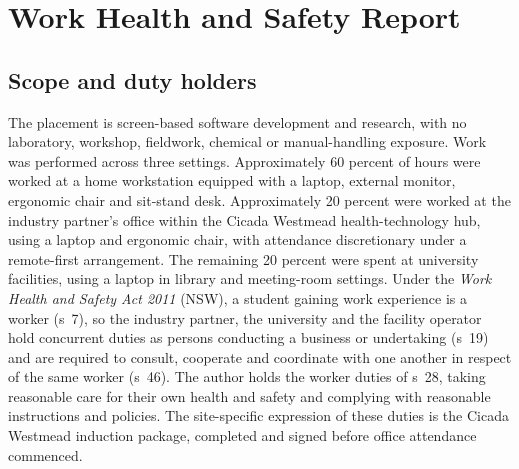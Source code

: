
\section{Work Health and Safety Report}
\label{app:whs}

\subsection{Scope and duty holders}
The placement is screen-based software development and research, with no
laboratory, workshop, fieldwork, chemical or manual-handling exposure. Work
was performed across three settings. Approximately 60 percent of hours were
worked at a home workstation equipped with a laptop, external monitor,
ergonomic chair and sit-stand desk. Approximately 20 percent were worked at
the industry partner's office within the Cicada Westmead health-technology
hub, using a laptop and ergonomic chair, with attendance discretionary
under a remote-first arrangement. The remaining 20 percent were spent at
university facilities, using a laptop in library and meeting-room settings.
Under the \textit{Work Health and Safety Act 2011} (NSW), a student gaining
work experience is a worker (s~7), so the industry partner, the university
and the facility operator hold concurrent duties as persons conducting a
business or undertaking (s~19) and are required to consult, cooperate and
coordinate with one another in respect of the same worker (s~46). The
author holds the worker duties of s~28, taking reasonable care for their
own health and safety and complying with reasonable instructions and
policies. The site-specific expression of these duties is the Cicada
Westmead induction package, completed and signed before office attendance
commenced.

